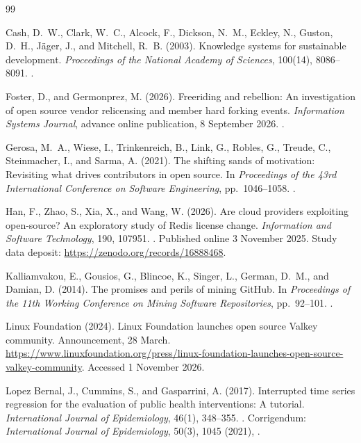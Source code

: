 \begin{thebibliography}{99}
\label{refs:chapter09}

Cash, D.~W., Clark, W.~C., Alcock, F., Dickson, N.~M., Eckley, N., Guston, D.~H., Jäger, J., and Mitchell, R.~B. (2003).
Knowledge systems for sustainable development.
\emph{Proceedings of the National Academy of Sciences}, 100(14), 8086--8091.
.

Foster, D., and Germonprez, M. (2026).
Freeriding and rebellion: An investigation of open source vendor relicensing and member hard forking events.
\emph{Information Systems Journal}, advance online publication, 8 September 2026.
.

Gerosa, M.~A., Wiese, I., Trinkenreich, B., Link, G., Robles, G., Treude, C., Steinmacher, I., and Sarma, A. (2021).
The shifting sands of motivation: Revisiting what drives contributors in open source.
In \emph{Proceedings of the 43rd International Conference on Software Engineering}, pp.~1046--1058.
.

Han, F., Zhao, S., Xia, X., and Wang, W. (2026).
Are cloud providers exploiting open-source? An exploratory study of Redis license change.
\emph{Information and Software Technology}, 190, 107951.
.
Published online 3 November 2025. Study data deposit: \url{https://zenodo.org/records/16888468}.

Kalliamvakou, E., Gousios, G., Blincoe, K., Singer, L., German, D.~M., and Damian, D. (2014).
The promises and perils of mining GitHub.
In \emph{Proceedings of the 11th Working Conference on Mining Software Repositories}, pp.~92--101.
.

Linux Foundation (2024).
Linux Foundation launches open source Valkey community.
Announcement, 28 March.
\url{https://www.linuxfoundation.org/press/linux-foundation-launches-open-source-valkey-community}.
Accessed 1 November 2026.

Lopez Bernal, J., Cummins, S., and Gasparrini, A. (2017).
Interrupted time series regression for the evaluation of public health interventions: A tutorial.
\emph{International Journal of Epidemiology}, 46(1), 348--355.
.
Corrigendum: \emph{International Journal of Epidemiology}, 50(3), 1045 (2021), .


\end{thebibliography}
